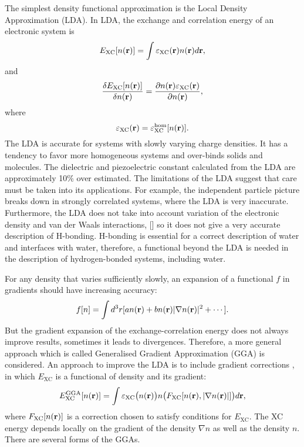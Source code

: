 The simplest density functional approximation is the Local Density Approximation (LDA). 
In LDA, the exchange and correlation energy of an electronic system is
\begin{equation}
E_{\text{XC}}[n({\bf r})]= \int\varepsilon_{\text{XC}}({\bf r}){n({\bf r})}d{\bf r},
\label{eq:E_XC}
\end{equation}
and
\begin{equation}
\frac{\delta E_{\text{XC}}[n({\bf r})]}{\delta n({\bf r})}=\frac{\partial n({\bf r})\varepsilon_{\text{XC}}({\bf r})}{\partial n({\bf r})},
\label{eq:delta_E_XC_2}
\end{equation}
where 
\begin{equation}
\varepsilon_{\text{XC}}({\bf r})= \varepsilon^{\text{hom}}_{\text{XC}}[n({\bf r})].
\end{equation}
The LDA is accurate for systems with slowly varying charge densities. It has a tendency to favor more homogeneous systems and over-binds solids and molecules. The dielectric and piezoelectric constant calculated from the LDA are approximately 10\% over estimated. 
The limitations of the LDA suggest that care must be taken into its applications. For example, the independent particle picture  breaks down in strongly correlated systems, where the LDA is very inaccurate. 
Furthermore, the LDA does not take into account variation of the electronic density and van der Waals interactions, [\cite{Burke07}] so it does not give a very accurate description of H-bonding.
H-bonding is essential for a correct description of water and interfaces 
with water, therefore, a functional beyond the LDA is needed in the description of hydrogen-bonded systems, including water.

For any density that varies sufficiently slowly, an expansion of a functional $f$ in gradients should have increasing
accuracy:
\begin{equation}
f[n]= \int d^3r [a n({\bf r})+b n({\bf r})|\nabla n({\bf r})|^2 + \cdots].
\label{eq:any_f}
\end{equation}
But the gradient expansion of the exchange-correlation energy does not always improve results, sometimes it leads to divergences.
Therefore, a more general approach which is called Generalised  Gradient Approximation (GGA) is considered. An approach to improve the 
LDA is to include gradient corrections , in which $E_{\text{XC}}$ is a functional of density and its gradient:
\begin{equation}
  E^{\text{GGA}}_{\text{XC}}[n({\bf r})] = \int \varepsilon_{\text{XC}}\bigl(n({\bf r})\bigr)n\bigl(F_{\text{XC}}[ n({\bf r}), |\nabla n({\bf r})| ]\bigr)d{\bf{r}},
\end{equation}
where $F_{\text{XC}}[n({\bf r})]$ is a correction chosen to satisfy conditions for $E_{\text{XC}}$. The XC energy depends locally on the
gradient of the density $\nabla n$ as well as the density $n$. There are several forms of the GGAs. 


